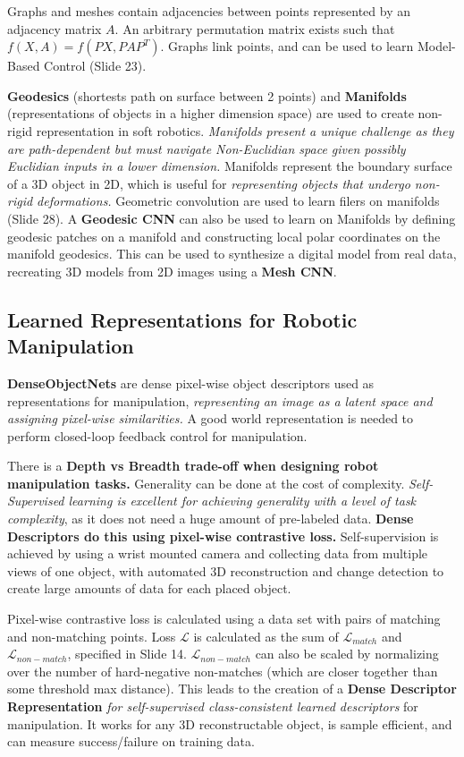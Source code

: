 \documentclass[onecolumn,a4paper]{article}
\begin{document}
Graphs and meshes contain adjacencies between points represented by an adjacency matrix $A$. An arbitrary permutation matrix exists such that $f(X,A) = f(PX, PAP^T)$. Graphs link points, and can be used to learn Model-Based Control (Slide 23).

\textbf{Geodesics} (shortests path on surface between 2 points) and \textbf{Manifolds} (representations of objects in a higher dimension space) are used to create non-rigid representation in soft robotics. \emph{Manifolds present a unique challenge as they are path-dependent but must navigate Non-Euclidian space given possibly Euclidian inputs in a lower dimension.} Manifolds represent the boundary surface of a 3D object in 2D, which is useful for \emph{representing objects that undergo non-rigid deformations.} Geometric convolution are used to learn filers on manifolds (Slide 28). A \textbf{Geodesic CNN} can also be used to learn on Manifolds by defining geodesic patches on a manifold and constructing local polar coordinates on the manifold geodesics. This can be used to synthesize a digital model from real data, recreating 3D models from 2D images using a \textbf{Mesh CNN}.

\subsection{Learned Representations for Robotic Manipulation}

\textbf{DenseObjectNets} are dense pixel-wise object descriptors used as representations for manipulation, \emph{representing an image as a latent space and assigning pixel-wise similarities.} A good world representation is needed to perform closed-loop feedback control for manipulation.

There is a \textbf{Depth vs Breadth trade-off when designing robot manipulation tasks.} Generality can be done at the cost of complexity. \emph{Self-Supervised learning is excellent for achieving generality with a level of task complexity}, as it does not need a huge amount of pre-labeled data. \textbf{Dense Descriptors do this using pixel-wise contrastive loss.} Self-supervision is achieved by using a wrist mounted camera and collecting data from multiple views of one object, with automated 3D reconstruction and change detection to create large amounts of data for each placed object.

Pixel-wise contrastive loss is calculated using a data set with pairs of matching and non-matching points. Loss $\mathcal{L}$ is calculated as the sum of $\mathcal{L}_{match}$ and $\mathcal{L}_{non-match}$, specified in Slide 14. $\mathcal{L}_{non-match}$ can also be scaled by normalizing over the number of hard-negative non-matches (which are closer together than some threshold max distance). This leads to the creation of a \textbf{Dense Descriptor Representation} \emph{for self-supervised class-consistent learned descriptors} for manipulation. It works for any 3D reconstructable object, is sample efficient, and can measure success/failure on training data.
\end{document}
